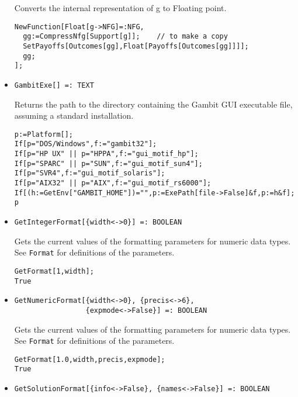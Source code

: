 \begin{itemize}
\bd 
Converts the internal representation of g to Floating point.  
\begin{verbatim}
NewFunction[Float[g->NFG]=:NFG,
  gg:=CompressNfg[Support[g]];    // to make a copy
  SetPayoffs[Outcomes[gg],Float[Payoffs[Outcomes[gg]]]];
  gg;
];  
\end{verbatim} 
\ed


\item{}
\protect \large \begin{verbatim}
GambitExe[] =: TEXT 
\end{verbatim}\normalsize

\bd 
Returns the path to the directory containing the Gambit GUI executable
file, assuming a standard installation.  
\begin{verbatim}
p:=Platform[];
If[p="DOS/Windows",f:="gambit32"];
If[p="HP UX" || p="HPPA",f:="gui_motif_hp"];
If[p="SPARC" || p="SUN",f:="gui_motif_sun4"];
If[p="SVR4",f:="gui_motif_solaris"];
If[p="AIX32" || p="AIX",f:="gui_motif_rs6000"];
If[(h:=GetEnv["GAMBIT_HOME"])="",p:=ExePath[file->False]&f,p:=h&f];
p
\end{verbatim} 
\ed

\item{}
\protect \large \begin{verbatim}
GetIntegerFormat[{width<->0}] =: BOOLEAN 
\end{verbatim} \normalsize

\bd 
Gets the current values of the formatting parameters for numeric
data types.  See \verb+Format+ for definitions of the
parameters.  
\begin{verbatim}
GetFormat[1,width];
True
\end{verbatim} 
\ed

\item{}
\protect \large \begin{verbatim}
GetNumericFormat[{width<->0}, {precis<->6}, 
                 {expmode<->False}] =: BOOLEAN 
\end{verbatim} \normalsize

\bd 
Gets the current values of the formatting parameters for numeric
data types.  See \verb+Format+ for definitions of the
parameters.  
\begin{verbatim}
GetFormat[1.0,width,precis,expmode];
True
\end{verbatim} 
\ed

\item{}
\protect \large \begin{verbatim}
GetSolutionFormat[{info<->False}, {names<->False}] =: BOOLEAN 
\end{verbatim} \normalsize


\end{itemize}
